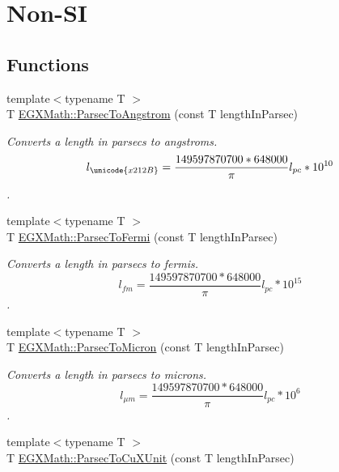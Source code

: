 \hypertarget{group___e_g_x_math-_conversions-_length_conversions-_astronomical-_parsec-_non-_s_i}{}\section{Non-\/\+SI}
\label{group___e_g_x_math-_conversions-_length_conversions-_astronomical-_parsec-_non-_s_i}
\subsection*{Functions}
\begin{DoxyCompactItemize}
\item 
{\footnotesize template$<$typename T $>$ }\\T \mbox{\hyperlink{group___e_g_x_math-_conversions-_length_conversions-_astronomical-_parsec-_non-_s_i_gae9721658cb4d8b9e1cfd85f20d646702}{E\+G\+X\+Math\+::\+Parsec\+To\+Angstrom}} (const T length\+In\+Parsec)
\begin{DoxyCompactList}\small\item\em Converts a length in parsecs to angstroms. \[ l_{\unicode{x212B}}=\frac{149597870700 * 648000}{\pi}l_{pc} * 10^{10} \]. \end{DoxyCompactList}\item 
{\footnotesize template$<$typename T $>$ }\\T \mbox{\hyperlink{group___e_g_x_math-_conversions-_length_conversions-_astronomical-_parsec-_non-_s_i_gac157e45cbd0a0ef15a52dcc59a7b40ad}{E\+G\+X\+Math\+::\+Parsec\+To\+Fermi}} (const T length\+In\+Parsec)
\begin{DoxyCompactList}\small\item\em Converts a length in parsecs to fermis. \[ l_{fm}=\frac{149597870700 * 648000}{\pi}l_{pc} * 10^{15} \]. \end{DoxyCompactList}\item 
{\footnotesize template$<$typename T $>$ }\\T \mbox{\hyperlink{group___e_g_x_math-_conversions-_length_conversions-_astronomical-_parsec-_non-_s_i_ga9460305baf1a39635da24198d888a91b}{E\+G\+X\+Math\+::\+Parsec\+To\+Micron}} (const T length\+In\+Parsec)
\begin{DoxyCompactList}\small\item\em Converts a length in parsecs to microns. \[ l_{\mu m}=\frac{149597870700 * 648000}{\pi}l_{pc} * 10^{6} \]. \end{DoxyCompactList}\item 
{\footnotesize template$<$typename T $>$ }\\T \mbox{\hyperlink{group___e_g_x_math-_conversions-_length_conversions-_astronomical-_parsec-_non-_s_i_gad21a910de08e37197d58edf64c377222}{E\+G\+X\+Math\+::\+Parsec\+To\+Cu\+X\+Unit}} (const T length\+In\+Parsec)

\end{DoxyCompactItemize}

